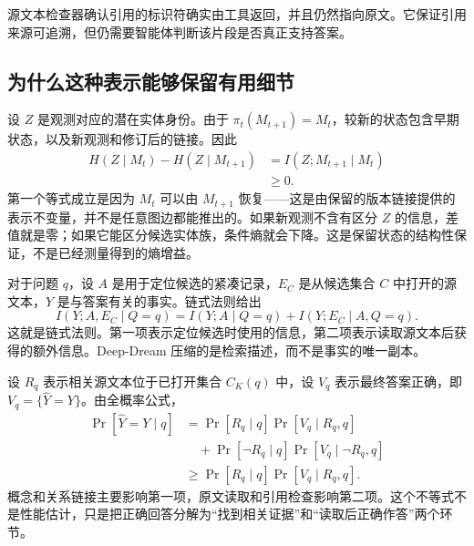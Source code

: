 源文本检查器确认引用的标识符确实由工具返回，并且仍然指向原文。它保证引用来源可追溯，但仍需要智能体判断该片段是否真正支持答案。

\subsection{为什么这种表示能够保留有用细节}
\label{sec:information-view}

设 $Z$ 是观测对应的潜在实体身份。由于 $\pi_t(M_{t+1})=M_t$，较新的状态包含早期状态，以及新观测和修订后的链接。因此
\begin{equation}
\begin{aligned}
H(Z\mid M_t)-H(Z\mid M_{t+1})
&=I(Z;M_{t+1}\mid M_t)\\
&\ge 0.
\end{aligned}
\label{eq:state-uncertainty}
\end{equation}
第一个等式成立是因为 $M_t$ 可以由 $M_{t+1}$ 恢复——这是由保留的版本链接提供的表示不变量，并不是任意图边都能推出的。如果新观测不含有区分 $Z$ 的信息，差值就是零；如果它能区分候选实体族，条件熵就会下降。这是保留状态的结构性保证，不是已经测量得到的熵增益。

对于问题 $q$，设 $A$ 是用于定位候选的紧凑记录，$E_C$ 是从候选集合 $C$ 中打开的源文本，$Y$ 是与答案有关的事实。链式法则给出
\begin{equation}
I(Y;A,E_C\mid Q=q)=I(Y;A\mid Q=q)+I(Y;E_C\mid A,Q=q).
\label{eq:two-rate-code}
\end{equation}
这就是链式法则。第一项表示定位候选时使用的信息，第二项表示读取源文本后获得的额外信息。Deep-Dream 压缩的是检索描述，而不是事实的唯一副本。

设 $R_q$ 表示相关源文本位于已打开集合 $C_K(q)$ 中，设 $V_q$ 表示最终答案正确，即 $V_q=\{\widehat Y=Y\}$。由全概率公式，
\begin{equation}
\begin{aligned}
\Pr[\widehat Y=Y\mid q]
&=\Pr[R_q\mid q]\Pr[V_q\mid R_q,q]\\
&\quad+\Pr[\neg R_q\mid q]\Pr[V_q\mid\neg R_q,q]\\
&\ge \Pr[R_q\mid q]\Pr[V_q\mid R_q,q].
\end{aligned}
\label{eq:answer-decomposition}
\end{equation}
概念和关系链接主要影响第一项，原文读取和引用检查影响第二项。这个不等式不是性能估计，只是把正确回答分解为“找到相关证据”和“读取后正确作答”两个环节。
